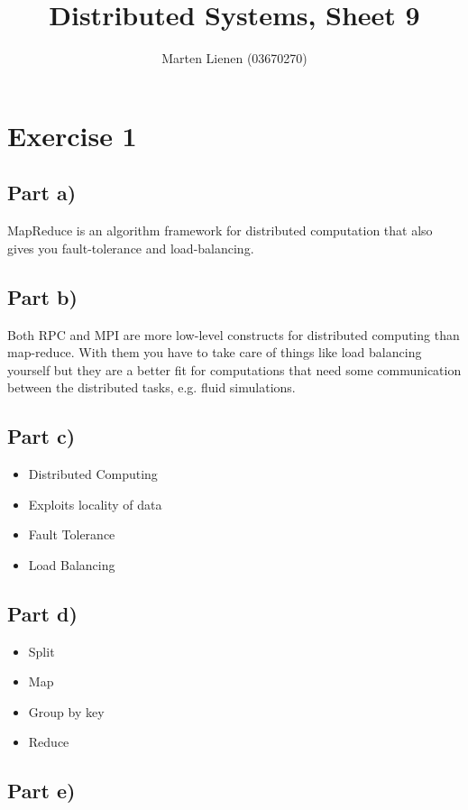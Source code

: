 \documentclass[10pt,a4paper]{article}
\title{Distributed Systems, Sheet 9}
\author{Marten Lienen (03670270)}
\begin{document}
\maketitle

\section*{Exercise 1}

\subsection*{Part a)}

MapReduce is an algorithm framework for distributed computation that also gives you fault-tolerance and load-balancing.

\subsection*{Part b)}

Both RPC and MPI are more low-level constructs for distributed computing than map-reduce.
With them you have to take care of things like load balancing yourself but they are a better fit for computations that need some communication between the distributed tasks, e.g. fluid simulations.

\subsection*{Part c)}

\begin{itemize}
\item Distributed Computing
\item Exploits locality of data
\item Fault Tolerance
\item Load Balancing
\end{itemize}

\subsection*{Part d)}

\begin{itemize}
\item Split
\item Map
\item Group by key
\item Reduce
\end{itemize}

\subsection*{Part e)}
\end{document}
